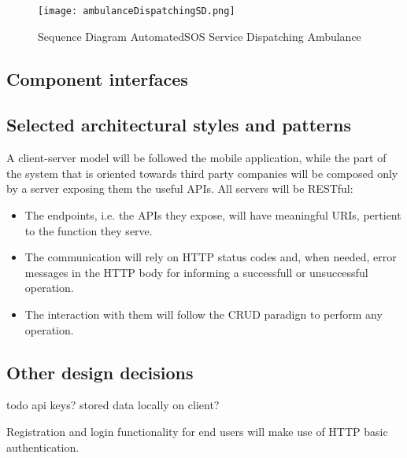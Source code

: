 \documentclass[../main.tex]{subfiles}
\begin{document}
\vspace*{2cm}

\begin{figure}[H]
        \centering
             \texttt{[image: ambulanceDispatchingSD.png]}
              \caption{Sequence Diagram AutomatedSOS Service Dispatching Ambulance}
               \label{fig:ambulanceDispatchingSD}
\end{figure}

\subsection{Component interfaces}

\subsection{Selected architectural styles and patterns}

A client-server model will be followed the mobile application, while the part of the system that is oriented towards third party companies will be composed only by a server exposing them the useful APIs. All servers will be RESTful:
\begin{itemize}
	\item The endpoints, i.e. the APIs they expose, will have meaningful URIs, pertient to the function they serve.
	\item The communication will rely on HTTP status codes and, when needed, error messages in the HTTP body for informing a successfull or unsuccessful operation.
	\item The interaction with them will follow the CRUD paradign to perform any operation.
\end{itemize}


\subsection{Other design decisions}

todo api keys? stored data locally on client?

Registration and login functionality for end users will make use of HTTP basic authentication.
\end{document}
